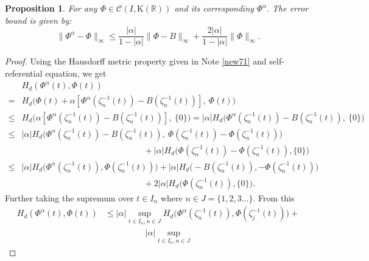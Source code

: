 \documentclass[12pt,oneside,reqno]{amsart}
\newtheorem{proposition}[theorem]{Proposition}
\theoremstyle{definition}
\theoremstyle{remark}
\begin{document}
 \begin{proposition}\label{new79}
 For any $\Phi\in \mathcal{C}(I,\mathrm{K}(\mathbb{R}))$ and its corresponding $\Phi^{\alpha}.$ The error bound is given by:
   \[\lVert \Phi^{\alpha} -\Phi\rVert _{\infty} \leq \frac{\lvert \alpha \rvert}{1- \lvert \alpha \rvert} \lVert \Phi-B \rVert _{\infty}+\frac{2 \lvert \alpha \rvert}{1- \lvert \alpha \rvert} \lVert \Phi \rVert_{\infty}.\]
 \end{proposition}
 \begin{proof}
Using the Hausdorff metric property given in Note \ref{new71} and self-referential equation, we get 
\begin{align*}
   & H_d(\Phi^{\alpha}(t), \Phi(t))\\
   =& H_d\bigg(\Phi(t) + \alpha  \left[\Phi^{\alpha}\left(\zeta_n^{-1}(t)\right) -                 B\left(\zeta_n^{-1}(t)\right)\right], ~\Phi(t)\bigg)\\ 
   \leq &  H_d\bigg( \alpha  \left[\Phi^{\alpha}\left(\zeta_n^{-1}(t)\right) -        B\left(\zeta_n^{-1}(t)\right)\right], ~\{0\}\bigg)=\lvert \alpha \rvert H_d\bigg(\Phi^{\alpha}\left(\zeta_n^{-1}(t)\right)- B\left(\zeta_n^{-1}(t)\right), ~\{0\}\bigg)\\
    \leq&  \lvert \alpha \rvert H_d\bigg(\Phi^{\alpha}\left(\zeta_n^{-1}(t)\right) -  B\left(\zeta_n^{-1}(t)\right),~ \Phi\left(\zeta_n^{-1}(t)\right)-\Phi\left(\zeta_n^{-1}(t)\right)\bigg)\\
    &\hspace{6cm}+\lvert \alpha \rvert H_d\bigg(\Phi\left(\zeta_n^{-1}(t)\right)-\Phi\left(\zeta_n^{-1}(t)\right), \{0\}\bigg)\\
    \leq &\lvert \alpha \rvert H_d\bigg(\Phi^{\alpha}\left(\zeta_n^{-1}(t)\right),  \Phi\left(\zeta_n^{-1}(t)\right)\bigg)+\lvert \alpha \rvert H_d\bigg(- B\left(\zeta_n^{-1}(t)\right),-\Phi\left(\zeta_n^{-1}(t)\right)\bigg)\\
    &\hspace{6cm}+2 \lvert \alpha \rvert H_d\bigg(\Phi\left(\zeta_n^{-1}(t)\right),\{0\}\bigg).
    \end{align*}
    Further taking the supremum over $t \in I_n$ where $n\in J=\{1,2,3\dots \}$. From this
     \begin{align*}
    H_d(\Phi^{\alpha}(t), \Phi(t)) &\leq \lvert \alpha \rvert \sup_{t\in I_n, n \in J}H_d\bigg(   \Phi^{\alpha}\left(\zeta_n^{-1}(t)\right),  \Phi\left(\zeta_j^{-1}(t)\right)\bigg)+\\ & \hspace{2cm}\lvert \alpha \rvert \sup_{t\in I_n, n \in J}

\end{align*}
\end{proof}
\end{document}
